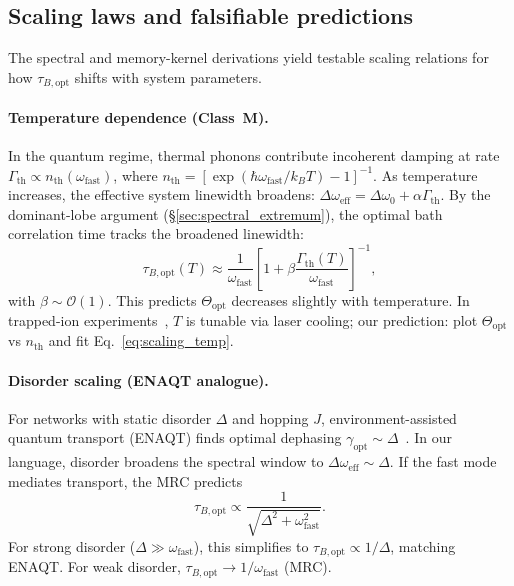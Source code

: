 \documentclass[11pt,letterpaper]{article}
\begin{document}
\subsection{Scaling laws and falsifiable predictions}
\label{sec:scaling_laws}

The spectral and memory-kernel derivations yield testable scaling relations for how $\tau_{B,\text{opt}}$ shifts with system parameters.

\paragraph{Temperature dependence (Class~M).} In the quantum regime, thermal phonons contribute incoherent damping at rate $\Gamma_{\text{th}}\propto n_{\text{th}}(\omega_{\mathrm{fast}})$, where $n_{\text{th}}=[\exp(\hbar\omega_{\mathrm{fast}}/k_BT)-1]^{-1}$. As temperature increases, the effective system linewidth broadens: $\Delta\omega_{\text{eff}} = \Delta\omega_0 + \alpha\Gamma_{\text{th}}$. By the dominant-lobe argument (§\ref{sec:spectral_extremum}), the optimal bath correlation time tracks the broadened linewidth:
\begin{equation}
\tau_{B,\text{opt}}(T) \approx \frac{1}{\omega_{\mathrm{fast}}}\left[1 + \beta\frac{\Gamma_{\text{th}}(T)}{\omega_{\mathrm{fast}}}\right]^{-1},
\label{eq:scaling_temp}
\end{equation}
with $\beta\sim\mathcal{O}(1)$. This predicts $\Theta_{\text{opt}}$ decreases slightly with temperature. In trapped-ion experiments~\cite{Maier2019}, $T$ is tunable via laser cooling; our prediction: plot $\Theta_{\text{opt}}$ vs $n_{\text{th}}$ and fit Eq.~\eqref{eq:scaling_temp}.

\paragraph{Disorder scaling (ENAQT analogue).} For networks with static disorder $\Delta$ and hopping $J$, environment-assisted quantum transport (ENAQT) finds optimal dephasing $\gamma_{\text{opt}}\sim\Delta$~\cite{Maier2019}. In our language, disorder broadens the spectral window to $\Delta\omega_{\text{eff}}\sim\Delta$. If the fast mode mediates transport, the MRC predicts
\begin{equation}
\tau_{B,\text{opt}} \propto \frac{1}{\sqrt{\Delta^2 + \omega_{\mathrm{fast}}^2}}.
\label{eq:scaling_disorder}
\end{equation}
For strong disorder ($\Delta \gg \omega_{\mathrm{fast}}$), this simplifies to $\tau_{B,\text{opt}}\propto 1/\Delta$, matching ENAQT. For weak disorder, $\tau_{B,\text{opt}}\to 1/\omega_{\mathrm{fast}}$ (MRC).
\end{document}
